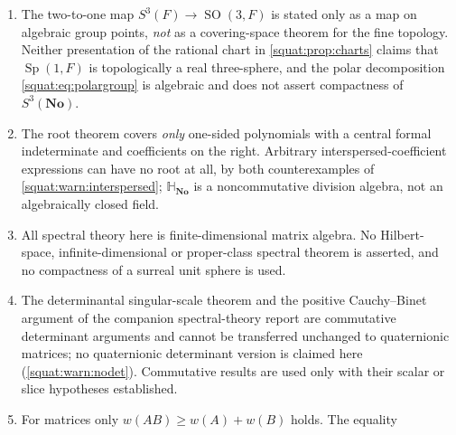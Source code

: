 \documentclass[11pt,letterpaper]{article}
\numberwithin{equation}{section}
\theoremstyle{definition}
\theoremstyle{remark}
\newcommand{\No}{\mathbf{No}}
\newcommand{\SQ}{\mathbb H_{\No}}
\newcommand{\HF}{\mathbb H_F}
\newcommand{\Ima}{\operatorname{Im}}
\newcommand{\SO}{\operatorname{SO}}
\newcommand{\Sp}{\operatorname{Sp}}
\begin{document}
\begin{enumerate}[label=\textup{(N\arabic*)},leftmargin=3.2em]
empirical subject, and none is made here. There is no assertion about spacetime,
relativity, quantum mechanics, gauge theory, renormalization, measurement, or physical
spin. The physics-adjacent vocabulary that does appear is strictly mathematical: ``spin''
refers to the algebraic double cover of \cref{squat:eq:spin3}; ``rotation'' always means an
element of $\SO(3,F)$ or $\SO(4,F)$ acting on $\Ima\HF$, never a physical motion; the
``avoided crossing'' of \cref{squat:ex:crossing} is finite Hermitian $2\times2$ linear
algebra; the ``angular velocity'' identity \cref{squat:eq:angular-velocity} is a derivation
identity in the surreal coefficients and expressly not a time evolution or an existence
theorem for trajectories; and ``condition number'' in
\cref{squat:prop:sylvester,squat:thm:conditioned} is an exact valuation-theoretic statement,
not a numerical heuristic.
\item\label{squat:nc:covering} The two-to-one map $S^3(F)\to\SO(3,F)$ is stated only as a
map on algebraic group points, \emph{not} as a covering-space theorem for the fine
topology. Neither presentation of the rational chart in \cref{squat:prop:charts}
claims that $\Sp(1,F)$ is topologically a real three-sphere, and the polar decomposition
\cref{squat:eq:polargroup} is algebraic and does not assert compactness of $S^3(\No)$.
\item\label{squat:nc:onesided} The root theorem covers \emph{only} one-sided polynomials
with a central formal indeterminate and coefficients on the right. Arbitrary
interspersed-coefficient expressions can have no root at all, by both counterexamples of
\cref{squat:warn:interspersed}; $\SQ$ is a noncommutative division algebra, not an
algebraically closed field.
\item\label{squat:nc:finitespectral} All spectral theory here is finite-dimensional matrix
algebra. No Hilbert-space, infinite-dimensional or proper-class spectral theorem is
asserted, and no compactness of a surreal unit sphere is used.
\item\label{squat:nc:nodeterminant} The determinantal singular-scale theorem and the
positive Cauchy--Binet argument of the companion spectral-theory report \cite{RepoSpec} are
commutative determinant arguments and cannot be transferred unchanged to quaternionic
matrices; no quaternionic determinant version is claimed here
(\cref{squat:warn:nodet}). Commutative results are used only with their scalar or
slice hypotheses established.
\item\label{squat:nc:matrixval} For matrices only $w(AB)\ge w(A)+w(B)$ holds. The equality

\end{enumerate}
\end{document}

